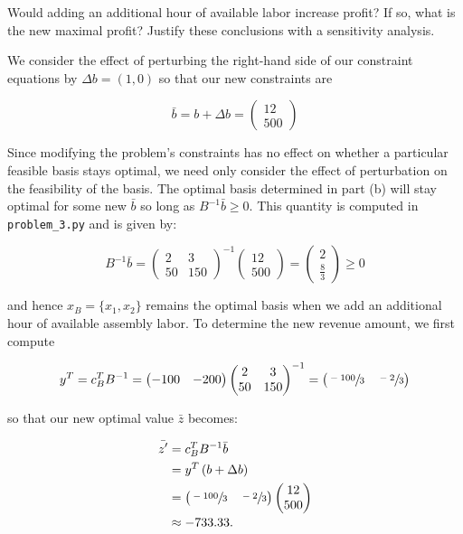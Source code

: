 Would adding an additional hour of available labor increase profit? If so, what is the new maximal profit? Justify these
conclusions with a sensitivity analysis.

\begin{solution}
  We consider the effect of perturbing the right-hand side of our constraint equations by $\Delta b = (1, 0)$ so that
  our new constraints are 

  $$
  \bar{b} = b + \Delta b = \begin{pmatrix} 12 \\ 500 \end{pmatrix}
  $$

  Since modifying the problem's constraints has no effect on whether a particular feasible basis stays optimal, we need
  only consider the effect of perturbation on the feasibility of the basis. The optimal basis determined in part (b) 
  will stay optimal for some new $\bar{b}$ so long as $B^{-1} \bar{b} \ge 0$. This quantity is computed in 
  \texttt{problem\_3.py} and is given by:

  $$
  B^{-1} \bar{b} = \begin{pmatrix} 
    2  & 3    \\
    50 & 150
  \end{pmatrix}^{-1} \begin{pmatrix} 
    12  \\
    500 
  \end{pmatrix} = \begin{pmatrix} 
    2  \\
    \frac{8}{3}
  \end{pmatrix} \ge 0
  $$

  and hence $x_B = \{ x_1, x_2 \}$ remains the optimal basis when we add an additional hour of available assembly labor.
  To determine the new revenue amount, we first compute

  $$
  y^T = c_B^T B^{-1} = \begin{pmatrix*}[r]
    -100 & -200
  \end{pmatrix*} \begin{pmatrix}
    2  & 3    \\
    50 & 150
  \end{pmatrix}^{-1} = \begin{pmatrix}
    \sfrac{-100}{3} & \sfrac{-2}{3}
  \end{pmatrix}
  $$

  so that our new optimal value $\bar{z}$ becomes: 
  
  \begin{align*}
    \bar{z'} &= c_B^T B^{-1} \bar{b} \\
             &= y^T \left(b + \Delta b \right) \\
             &=\begin{pmatrix}
                 \sfrac{-100}{3} & \sfrac{-2}{3}
               \end{pmatrix} \begin{pmatrix}
                 12  \\
                 500
               \end{pmatrix} \\
             &\approx -733.33.
  \end{align*}


\end{solution}

